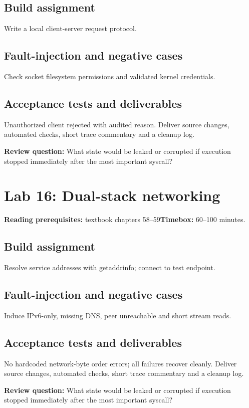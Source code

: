 \documentclass[11pt,letterpaper,oneside]{report}
\begin{document}
\subsection{Build assignment}
Write a local client-server request protocol.

\subsection{Fault-injection and negative cases}
Check socket filesystem permissions and validated kernel credentials.

\subsection{Acceptance tests and deliverables}
Unauthorized client rejected with audited reason. Deliver source changes, automated checks, short trace commentary and a cleanup log.

\textbf{Review question:} What state would be leaked or corrupted if execution stopped immediately after the most important syscall?

\section{Lab 16: Dual-stack networking}
\textbf{Reading prerequisites:} textbook chapters 58--59\quad \textbf{Timebox:} 60--100 minutes.

\subsection{Build assignment}
Resolve service addresses with getaddrinfo; connect to test endpoint.

\subsection{Fault-injection and negative cases}
Induce IPv6-only, missing DNS, peer unreachable and short stream reads.

\subsection{Acceptance tests and deliverables}
No hardcoded network-byte order errors; all failures recover cleanly. Deliver source changes, automated checks, short trace commentary and a cleanup log.

\textbf{Review question:} What state would be leaked or corrupted if execution stopped immediately after the most important syscall?
\end{document}
